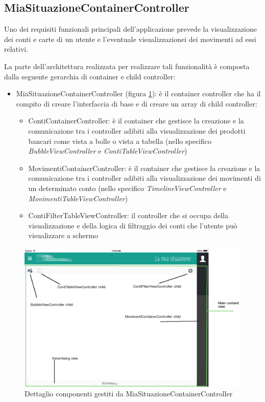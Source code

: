 \subsection{MiaSituazioneContainerController}
\label{parag:miasituaz}
Uno dei requisiti funzionali principali dell'applicazione prevede la visualizzazione dei conti e carte di un utente e l'eventuale visualizzazionei dei movimenti ad essi relativi.

La parte dell'architettura realizzata per realizzare tali funzionalità è composta dalla seguente gerarchia di container e child controller:

\begin{itemize}
 \item MiaSituazioneContainerController (figura \ref{fig:miasituazione}): è il container controller che ha il compito di creare l'interfaccia di base e di creare un array di child controller:
 \begin{itemize}
  \item ContiContainerController: è il container che gestisce la creazione e la comunicazione tra i controller adibiti alla visualizzazione dei prodotti bancari come vista a bolle o vista a tabella (nello specifico \emph{BubbleViewController} e \emph{ContiTableViewController})
  \item MovimentiContainerController: è il container che gestisce la creazione e la comunicazione tra i controller adibiti alla visualizzazione dei movimenti di un determinato conto (nello specifico \emph{TimelineViewController} e \emph{MovimentiTableViewController})
  \item ContiFilterTableViewController: il controller che si occupa della visualizzazione e della logica di filtraggio dei conti che l'utente può visualizzare a schermo
 \end{itemize}
\end{itemize}
\begin{figure}[!htbp]
\centering
\includegraphics[scale=0.35]{dettagli/miasituazione.png}
\caption{Dettaglio componenti gestiti da MiaSituazioneContainerController}
\label{fig:miasituazione}
\end{figure}
